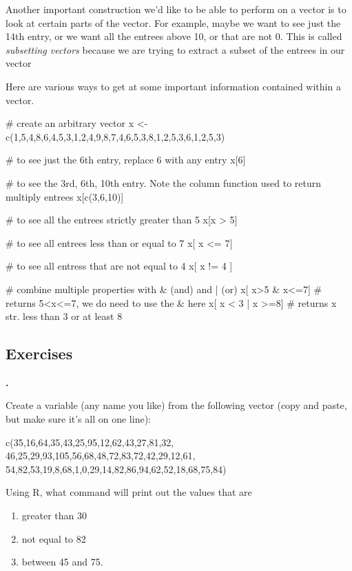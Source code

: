 \documentclass[11pt]{amsart}
\renewcommand{\(}{\left(}
\renewcommand{\)}{\right)}
\newcounter{CounterQ}
\newenvironment{q}{%
	\refstepcounter{CounterQ}
	\noindent\textbf{\Large{\theCounterQ}.}
}{
	\vspace{2ex}
}
\begin{document}
Another important construction we'd like to be able to perform on a
vector is to look at certain parts of the vector. For example, maybe
we want to see just the 14th entry, or we want all the entrees above
10, or that are not 0.  This is called \emph{subsetting vectors}
because we are trying to extract a subset of the entrees in our vector
  
Here are various ways to get at some important information contained
within a vector.
  
\begin{rcode}
  # create an arbitrary vector
  x <- c(1,5,4,8,6,4,5,3,1,2,4,9,8,7,4,6,5,3,8,1,2,5,3,6,1,2,5,3)
  
  # to see just the 6th entry, replace 6 with any entry
  x[6]
  
  # to see the 3rd, 6th, 10th entry. Note the column function used to return multiply entrees
  x[c(3,6,10)]
  
  # to see all the entrees strictly greater than 5
  x[x > 5]
  
  # to see all entrees less than or equal to 7
  x[ x <= 7]
  
  # to see all entress that are not equal to 4
  x[ x != 4 ]
  
  # combine multiple properties with & (and) and | (or)
  x[ x>5 & x<=7] # returns 5<x<=7, we do need to use the & here
  x[ x < 3 | x >=8] # returns x str. less than 3 or at least 8    
\end{rcode}

\subsection{Exercises}

\begin{q}
  Create a variable (any name you like) from the following vector
  (copy and paste, but make sure it's all on one line):

\begin{rcode}
  c(35,16,64,35,43,25,95,12,62,43,27,81,32,
  46,25,29,93,105,56,68,48,72,83,72,42,29,12,61,
  54,82,53,19,8,68,1,0,29,14,82,86,94,62,52,18,68,75,84)
\end{rcode}

  Using R, what command will print out the values that are
  \begin{enumerate}
  \item greater than 30
  \item not equal to 82
  \item between 45 and 75.
  \end{enumerate} 
\end{q} 
\end{document}
